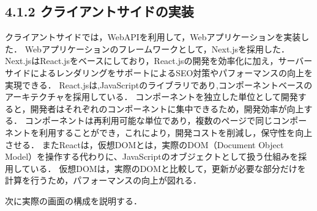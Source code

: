

\subsection*{4.1.2 クライアントサイドの実装}
クライアントサイドでは，WebAPIを利用して，Webアプリケーションを実装した．
Webアプリケーションのフレームワークとして，Next.jsを採用した．
Next.jsはReact.jsをベースにしており，React.jsの開発を効率化に加え，サーバーサイドによるレンダリングをサポートによるSEO対策やパフォーマンスの向上を実現できる．
React.jsは,JavaScriptのライブラリであり,コンポーネントベースのアーキテクチャを採用している．
コンポーネントを独立した単位として開発すると，開発者はそれぞれのコンポーネントに集中できるため，開発効率が向上する．
コンポーネントは再利用可能な単位であり，複数のページで同じコンポーネントを利用することができ，これにより，開発コストを削減し，保守性を向上させる．
またReactは，仮想DOMとは，実際のDOM（Document Object Model）を操作する代わりに、JavaScriptのオブジェクトとして扱う仕組みを採用している．
仮想DOMは，実際のDOMと比較して，更新が必要な部分だけを計算を行うため，パフォーマンスの向上が図れる．


次に実際の画面の構成を説明する．

